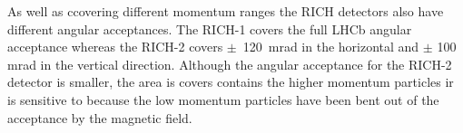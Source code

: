 As well as ccovering different momentum ranges the RICH detectors also have different angular acceptances. The RICH-1 covers the full LHCb angular acceptance whereas the RICH-2 covers $\pm$~120~mrad in the horizontal and $\pm$ 100 mrad in the vertical direction. 
Although the angular acceptance for the RICH-2 detector is smaller, the area is covers contains the higher momentum particles ir is sensitive to because the low momentum particles have been bent out of the acceptance by the magnetic field.







 
